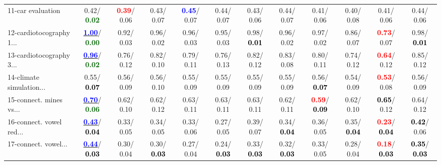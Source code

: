 \begin{table}[h]
\begin{center}
{\begin{tabular}{lc|c|c|c|c|c|c|c|c|c|c}
11-car evaluation &   0.42/\textcolor{darkgreen}{\textbf{  0.02}} & \textcolor{red}{\textbf{  0.39}}/  0.06 &   0.43/  0.07 & \textcolor{blue}{\textbf{  0.45}}/  0.07 &   0.44/  0.07 &   0.43/  0.06 &   0.44/  0.07 &   0.41/  0.06 &   0.40/  0.08 &   0.41/  0.06 &   0.44/  0.06 \\
12-cardiotocography 1... & \underline{\textcolor{blue}{\textbf{  1.00}}}/\textcolor{darkgreen}{\textbf{  0.00}} &   0.92/  0.03 &   0.96/  0.02 &   0.96/  0.03 &   0.95/  0.03 &   0.98/\textcolor{black}{\textbf{  0.01}} &   0.96/  0.02 &   0.97/  0.02 &   0.86/  0.07 & \textcolor{red}{\textbf{  0.73}}/  0.07 &   0.98/\textcolor{black}{\textbf{  0.01}} \\
13-cardiotocography 3... & \underline{\textcolor{blue}{\textbf{  0.96}}}/\textcolor{darkgreen}{\textbf{  0.02}} &   0.76/  0.12 &   0.82/  0.10 &   0.79/  0.11 &   0.76/  0.13 &   0.82/  0.12 &   0.83/  0.08 &   0.80/  0.11 &   0.74/  0.12 & \textcolor{red}{\textbf{  0.64}}/  0.12 &   0.85/  0.12 \\
14-climate simulation... &   0.55/\textcolor{black}{\textbf{  0.07}} &   0.56/  0.09 &   0.56/  0.10 &   0.55/  0.09 &   0.55/  0.09 &   0.55/  0.09 &   0.55/  0.09 &   0.56/\textcolor{black}{\textbf{  0.07}} &   0.54/  0.09 & \textcolor{red}{\textbf{  0.53}}/  0.08 &   0.56/  0.09 \\ \hline
15-connect. mines vs... & \underline{\textcolor{blue}{\textbf{  0.70}}}/\textcolor{darkgreen}{\textbf{  0.06}} &   0.62/  0.10 &   0.62/  0.12 &   0.63/  0.11 &   0.63/  0.11 &   0.63/  0.11 &   0.62/  0.11 & \textcolor{red}{\textbf{  0.59}}/\textcolor{black}{\textbf{  0.09}} &   0.62/  0.10 & \textcolor{black}{\textbf{  0.65}}/  0.12 &   0.64/  0.12 \\
16-connect. vowel red... & \underline{\textcolor{blue}{\textbf{  0.43}}}/\textcolor{black}{\textbf{  0.04}} &   0.33/  0.05 &   0.34/  0.05 &   0.33/  0.06 &   0.27/  0.05 &   0.39/  0.07 &   0.34/\textcolor{black}{\textbf{  0.04}} &   0.36/  0.05 &   0.35/\textcolor{black}{\textbf{  0.04}} & \textcolor{red}{\textbf{  0.23}}/\textcolor{black}{\textbf{  0.04}} & \textcolor{black}{\textbf{  0.42}}/  0.06 \\
17-connect. vowel... & \underline{\textcolor{blue}{\textbf{  0.44}}}/\textcolor{black}{\textbf{  0.03}} &   0.30/  0.04 &   0.30/\textcolor{black}{\textbf{  0.03}} &   0.27/  0.04 &   0.24/\textcolor{black}{\textbf{  0.03}} &   0.33/\textcolor{black}{\textbf{  0.03}} &   0.32/\textcolor{black}{\textbf{  0.03}} &   0.33/  0.05 &   0.28/  0.04 & \textcolor{red}{\textbf{  0.18}}/\textcolor{black}{\textbf{  0.03}} & \textcolor{black}{\textbf{  0.35}}/\textcolor{black}{\textbf{  0.03}} \\

\end{tabular}}
\end{center}
\end{table}
